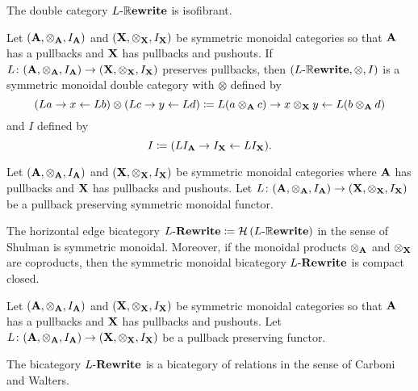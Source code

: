 \documentclass{amsart}
\begin{document}
\begin{thm} \label{thm_rewrite-isofibrant}
	The double category $ L \text{-} \mathbb{R}\mathbf{ewrite} $ is isofibrant.
\end{thm}

\begin{thm} \label{thm_rewrite-dble-cat-smc}
	Let $ (\mathbf{A}, \otimes_{\mathbf{A}}, I_{\mathbf{A}}) $ and $ (\mathbf{X}, \otimes_{\mathbf{X}}, I_{\mathbf{X}}) $ be symmetric monoidal categories so that $ \mathbf{A} $ has a pullbacks and $ \mathbf{X} $ has pullbacks and pushouts. If $ L \colon (\mathbf{A}, \otimes_{\mathbf{A}}, I_{\mathbf{A}}) \to (\mathbf{X}, \otimes_{\mathbf{X}}, I_{\mathbf{X}}) $ preserves pullbacks, then $ (L \text{-} \mathbb{R}\mathbf{ewrite} , \otimes , I) $ is a symmetric monoidal double category with $ \otimes $ defined by
	\[
	\left( L a \to x \gets L b \right) \otimes
	\left( L c \to y \gets L d	\right) \coloneqq
	L (a \otimes_{\mathbf{A}} c) \to 
	x \otimes_{\mathbf{X}} y \gets L (b \otimes_{\mathbf{A}} d)
	\]
	and $ I $ defined by		
	\[
	I \coloneqq ( L I_{\mathbf{A}} \to I_{\mathbf{X}} \gets L I_{\mathbf{X}} ).
	\]
\end{thm}

\begin{thm} \label{thm_rewrite_smcc}
	Let $ (\mathbf{A}, \otimes_{\mathbf{A}}, I_{\mathbf{A}}) $ and $ (\mathbf{X}, \otimes_{\mathbf{X}}, I_{\mathbf{X}}) $ be symmetric monoidal categories where $ \mathbf{A} $ has pullbacks and $ \mathbf{X} $ has pullbacks and pushouts.  Let $ L \colon (\mathbf{A}, \otimes_{\mathbf{A}}, I_{\mathbf{A}}) \to (\mathbf{X}, \otimes_{\mathbf{X}}, I_{\mathbf{X}}) $ be a pullback preserving symmetric monoidal functor.	
	
	The horizontal edge bicategory $ L \text{-} \mathbf{Rewrite} \coloneqq  \mathcal{H} \left( L \text{-} \mathbb{R}\mathbf{ewrite} \right) $ in the sense of Shulman is symmetric monoidal. Moreover, if the monoidal products $ \otimes_{\mathbf{A}} $ and $ \otimes_{\mathbf{X}} $ are coproducts, then the symmetric monoidal bicategory $ L \text{-} \mathbf{Rewrite} $ is compact closed.
\end{thm}

\begin{thm} \label{thm_rewrite-bicategory-relations}
	Let $ (\mathbf{A}, \otimes_{\mathbf{A}}, I_{\mathbf{A}}) $ and $ (\mathbf{X}, \otimes_{\mathbf{X}}, I_{\mathbf{X}}) $ be symmetric monoidal categories so that $ \mathbf{A} $ has a pullbacks and $ \mathbf{X} $ has pullbacks and pushouts.  Let $ L \colon (\mathbf{A}, \otimes_{\mathbf{A}}, I_{\mathbf{A}}) \to (\mathbf{X}, \otimes_{\mathbf{X}}, I_{\mathbf{X}}) $ be a pullback preserving functor.	
	
	The bicategory $ L \text{-} \mathbf{Rewrite} $ is a bicategory of relations in the sense of Carboni and Walters.
\end{thm}
\end{document}
